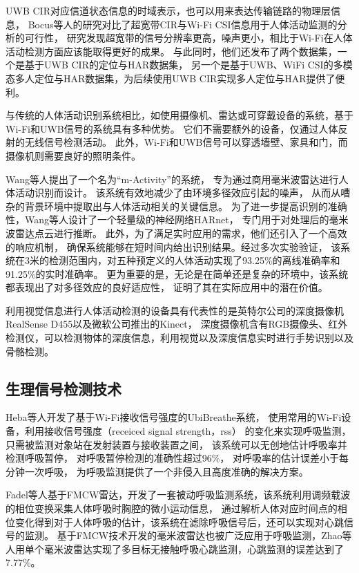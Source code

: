 UWB CIR对应信道状态信息的时域表示，也可以用来表达传输链路的物理层信息，
Bocus等人\cite{Bocus_comp}的研究对比了超宽带CIR与Wi-Fi CSI信息用于人体活动监测的分析的可行性，
研究发现超宽带的信号分辨率更高，噪声更小，相比于Wi-Fi在人体活动检测方面应该能取得更好的成果。
与此同时，他们还发布了两个数据集，一个是基于UWB CIR的定位与HAR数据集\cite{Bocus_dataset}，
另一个是基于UWB、WiFi CSI的多模态多人定位与HAR数据集\cite{Bocus_dataset_IPL}，为后续使用UWB CIR实现多人定位与HAR提供了便利。

与传统的人体活动识别系统相比，如使用摄像机、雷达或可穿戴设备的系统，基于Wi-Fi和UWB信号的系统具有多种优势。
它们不需要额外的设备，仅通过人体反射的无线信号检测活动。
此外，Wi-Fi和UWB信号可以穿透墙壁、家具和门，而摄像机则需要良好的照明条件。 

Wang等人\cite{Wang_Wifi_HAR}提出了一个名为“m-Activity”的系统，
专为通过商用毫米波雷达进行人体活动识别而设计。
该系统有效地减少了由环境多径效应引起的噪声，
从而从嘈杂的背景环境中提取出与人体活动相关的关键信息。
为了进一步提高识别的准确性，Wang等人设计了一个轻量级的神经网络HARnet，
专门用于对处理后的毫米波雷达点云进行推断。
此外，为了满足实时应用的需求，他们还引入了一个高效的响应机制，
确保系统能够在短时间内给出识别结果。经过多次实验验证，
该系统在3米的检测范围内，对五种预定义的人体活动实现了93.25\%的离线准确率和91.25\%的实时准确率。
更为重要的是，无论是在简单还是复杂的环境中，该系统都表现出了对多径效应的良好适应性，
证明了其在实际应用中的潜在价值。

利用视觉信息进行人体活动检测的设备具有代表性的是英特尔公司的深度摄像机RealSense D455以及微软公司推出的Kinect，
深度摄像机含有RGB摄像头、红外检测仪，可以检测物体的深度信息，利用视觉以及深度信息实时进行手势识别以及骨骼检测。

\subsection{生理信号检测技术}
Heba等人\cite{UbiBreathe}开发了基于Wi-Fi接收信号强度的UbiBreathe系统，
使用常用的Wi-Fi设备，利用接收信号强度（receiced signal strength，rss）
的变化来实现呼吸监测，只需被监测对象站在发射装置与接收装置之间，
该系统可以无创地估计呼吸率并检测呼吸暂停，
对呼吸暂停检测的准确性超过96\%，
对呼吸率的估计误差小于每分钟一次呼吸，
为呼吸监测提供了一个非侵入且高度准确的解决方案。

Fadel等人\cite{Adib_Breathe}基于FMCW雷达，开发了一套被动呼吸监测系统，该系统利用调频载波的相位变换采集人体呼吸时胸腔的微小运动信息，
通过解析人体对应时间点的相位变化得到对于人体呼吸的估计，该系统在滤除呼吸信号后，还可以实现对心跳信号的监测。
基于FMCW技术开发的毫米波雷达也被广泛应用于呼吸监测，Zhao等人\cite{zhao_Breathe}用单个毫米波雷达实现了多目标无接触呼吸心跳监测，心跳监测的误差达到了7.77\%。

